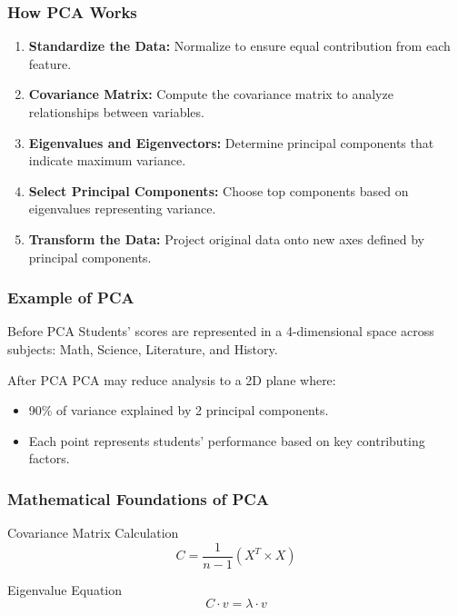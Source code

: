 \documentclass[aspectratio=169]{beamer}
\begin{document}
\begin{frame}[fragile]
    \frametitle{How PCA Works}
    \begin{enumerate}
        \item \textbf{Standardize the Data:} Normalize to ensure equal contribution from each feature.
        \item \textbf{Covariance Matrix:} Compute the covariance matrix to analyze relationships between variables.
        \item \textbf{Eigenvalues and Eigenvectors:} Determine principal components that indicate maximum variance.
        \item \textbf{Select Principal Components:} Choose top components based on eigenvalues representing variance.
        \item \textbf{Transform the Data:} Project original data onto new axes defined by principal components.
    \end{enumerate}
\end{frame}

\begin{frame}[fragile]
    \frametitle{Example of PCA}
    \begin{block}{Before PCA}
        Students' scores are represented in a 4-dimensional space across subjects: Math, Science, Literature, and History.
    \end{block}
    \begin{block}{After PCA}
        PCA may reduce analysis to a 2D plane where:
        \begin{itemize}
            \item 90\% of variance explained by 2 principal components.
            \item Each point represents students' performance based on key contributing factors.
        \end{itemize}
    \end{block}
\end{frame}

\begin{frame}[fragile]
    \frametitle{Mathematical Foundations of PCA}
    \begin{block}{Covariance Matrix Calculation}
    \begin{equation}
        C = \frac{1}{n-1} (X^T \times X)
    \end{equation}
    \end{block}
    \begin{block}{Eigenvalue Equation}
    \begin{equation}
        C \cdot v = \lambda \cdot v
    \end{equation}
    \end{block}
\end{frame}
\end{document}
